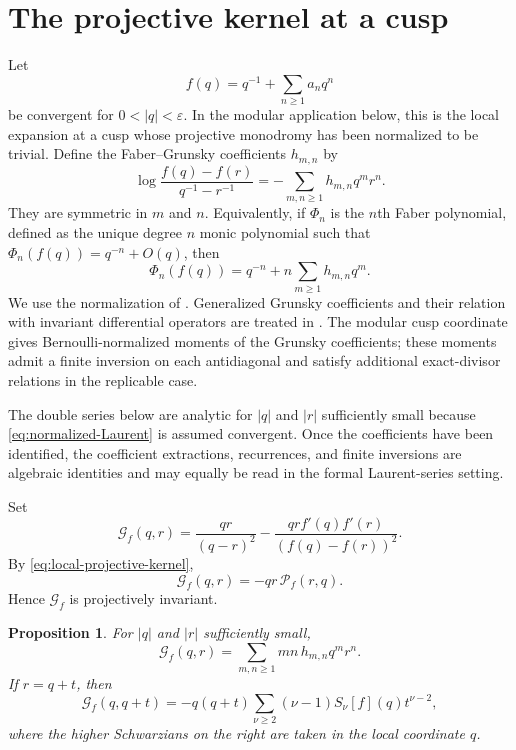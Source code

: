 \documentclass[11pt]{amsart}
\newtheorem{prop}[thm]{Proposition}
\theoremstyle{definition}
\theoremstyle{remark}
\numberwithin{equation}{section}
\begin{document}
\section{The projective kernel at a cusp}\label{sec:grunsky}

Let
\begin{equation}\label{eq:normalized-Laurent}
f(q)=q^{-1}+\sum_{n\geq1}a_nq^n
\end{equation}
be convergent for $0<|q|<\varepsilon$. In the modular application below, this is the local expansion at a cusp whose projective monodromy has been normalized to be trivial. Define the Faber--Grunsky coefficients $h_{m,n}$ by
\begin{equation*}
\log\frac{f(q)-f(r)}{q^{-1}-r^{-1}}
=-\sum_{m,n\geq1}h_{m,n}q^mr^n.
\end{equation*}
They are symmetric in $m$ and $n$. Equivalently, if $\Phi_n$ is the $n$th Faber polynomial, defined as the unique  degree $n$ monic polynomial such that $\Phi_n(f(q))=q^{-n}+O(q)$, then
\[
\Phi_n(f(q))=q^{-n}+n\sum_{m\geq1}h_{m,n}q^m.
\]
We use the normalization of \cite{mckay-sebbar-replicable}. Generalized Grunsky coefficients and their relation with invariant differential operators are treated in \cite{harmelin-grunsky}. The modular cusp coordinate gives Bernoulli-normalized moments of the Grunsky coefficients; these moments admit a finite inversion on each antidiagonal and satisfy additional exact-divisor relations in the replicable case.

The double series below are analytic for $|q|$ and $|r|$ sufficiently small because \eqref{eq:normalized-Laurent} is assumed convergent. Once the coefficients have been identified, the coefficient extractions, recurrences, and finite inversions are algebraic identities and may equally be read in the formal Laurent-series setting.

Set
\begin{equation}\label{eq:projective-grunsky-kernel}
\mathcal G_f(q,r)
=
\frac{qr}{(q-r)^2}
-
\frac{qr f'(q)f'(r)}{(f(q)-f(r))^2}.
\end{equation}
By \eqref{eq:local-projective-kernel},
\begin{equation}\label{eq:G-P}
\mathcal G_f(q,r)=-qr\,\mathcal P_f(r,q).
\end{equation}
Hence $\mathcal G_f$ is projectively invariant.

\begin{prop}\label{prop:grunsky-kernel}
For $|q|$ and $|r|$ sufficiently small,
\begin{equation}\label{eq:grunsky-kernel-expansion}
\mathcal G_f(q,r)
=
\sum_{m,n\geq1}mn\,h_{m,n}q^mr^n.
\end{equation}
If $r=q+t$, then
\begin{equation}\label{eq:kernel-higher-schwarzian}
\mathcal G_f(q,q+t)
=
-q(q+t)\sum_{\nu\geq2}(\nu-1)S_\nu[f](q)t^{\nu-2},
\end{equation}
where the higher Schwarzians on the right are taken in the local coordinate $q$.
\end{prop}
\end{document}
